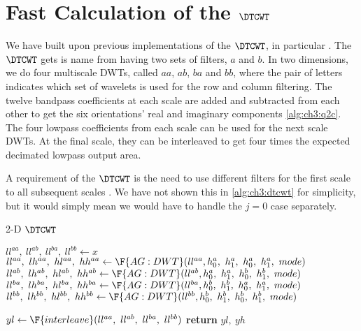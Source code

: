 \section{Fast Calculation of the $\DTCWT$}\label{sec:ch3:dtcwt}
We have built upon previous implementations of the $\DTCWT$, in particular
\cite{kingsbury_dtcwt_2003, cai_2-d_2011, wareham_dtcwt_2014}. The $\DTCWT$ gets
is name from having two sets of filters, $a$ and $b$. In two dimensions, we do
four multiscale DWTs, called $aa$, $ab$, $ba$ and $bb$, where the pair of letters indicates
which set of wavelets is used for the row and column filtering. The twelve
bandpass coefficients at each scale are added and subtracted from each other to
get the six orientations' real and imaginary components \autoref{alg:ch3:q2c}.
The four lowpass coefficients from each scale can be used for the next scale
DWTs. At the final scale, they can be interleaved to get four times the expected
decimated lowpass output area.

A requirement of the $\DTCWT$ is the need to use different filters for the first
scale to all subsequent scales \cite{selesnick_dual-tree_2005}. We have not
shown this in \autoref{alg:ch3:dtcwt} for simplicity, but it would simply mean
we would have to handle the $j=0$ case separately.

\begin{algorithm}[tb]
\caption{2-D $\DTCWT$}\label{alg:ch3:dtcwt}
\begin{algorithmic}[1]
\State $ll^{aa},\ ll^{ab},\ ll^{ba},\ ll^{bb} \gets x$
  \State $ll^{aa},\ lh^{aa},\ hl^{aa},\ hh^{aa} \gets \F{AG:DWT}(ll^{aa}, h_0^a,\ h_1^a,\ h_0^a,\ h_1^a,\ mode)$
  \State $ll^{ab},\ lh^{ab},\ hl^{ab},\ hh^{ab} \gets \F{AG:DWT}(ll^{ab}, h_0^a,\ h_1^a,\ h_0^b,\ h_1^b,\ mode)$
  \State $ll^{ba},\ lh^{ba},\ hl^{ba},\ hh^{ba} \gets \F{AG:DWT}(ll^{ba}, h_0^b,\ h_1^b,\ h_0^a,\ h_1^a,\ mode)$
  \State $ll^{bb},\ lh^{bb},\ hl^{bb},\ hh^{bb} \gets \F{AG:DWT}(ll^{bb}, h_0^b,\ h_1^b,\ h_0^b,\ h_1^b,\ mode)$
  \State {}
\EndFor
\State $yl \gets \F{interleave}(ll^{aa},\ ll^{ab},\ ll^{ba},\ ll^{bb})$
\State \textbf{return} $yl,\ yh$
\EndFunction
\end{algorithmic}\vspace{10pt}
\end{algorithm}


